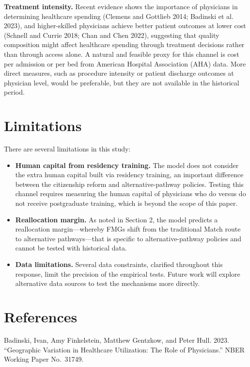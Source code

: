 \documentclass[12pt]{article}
\begin{document}
\textbf{Treatment intensity.} Recent evidence shows the importance of physicians in determining healthcare spending (Clemens and Gottlieb 2014; Badinski et al. 2023), and higher-skilled physicians achieve better patient outcomes at lower cost (Schnell and Currie 2018; Chan and Chen 2022), suggesting that quality composition might affect healthcare spending through treatment decisions rather than through access alone. A natural and feasible proxy for this channel is cost per admission or per bed from American Hospital Association (AHA) data. More direct measures, such as procedure intensity or patient discharge outcomes at physician level, would be preferable, but they are not available in the historical period.

\section{Limitations}

There are several limitations in this study:

\begin{itemize}
    \item \textbf{Human capital from residency training.} The model does not consider the extra human capital built via residency training, an important difference between the citizenship reform and alternative-pathway policies. Testing this channel requires measuring the human capital of physicians who do versus do not receive postgraduate training, which is beyond the scope of this paper.
    
    \item \textbf{Reallocation margin.} As noted in Section 2, the model predicts a reallocation margin---whereby FMGs shift from the traditional Match route to alternative pathways---that is specific to alternative-pathway policies and cannot be tested with historical data.
    
    \item \textbf{Data limitations.} Several data constraints, clarified throughout this response, limit the precision of the empirical tests. Future work will explore alternative data sources to test the mechanisms more directly.
\end{itemize}

\section*{References}

\noindent Badinski, Ivan, Amy Finkelstein, Matthew Gentzkow, and Peter Hull. 2023. ``Geographic Variation in Healthcare Utilization: The Role of Physicians.'' NBER Working Paper No.\ 31749.
\end{document}

